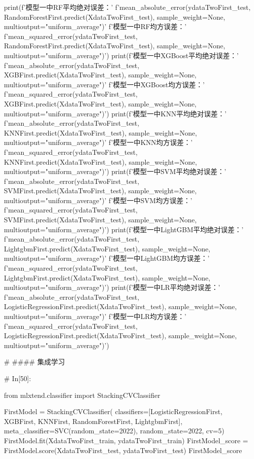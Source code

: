 \documentclass{MathorCupmodeling}
\begin{document}
\begin{python}
	
	print(f'模型一中RF平均绝对误差：'
		  f'{mean_absolute_error(ydataTwoFirst_test, RandomForestFirst.predict(XdataTwoFirst_test), sample_weight=None, multioutput="uniform_average")}\n'
		  f'模型一中RF均方误差：'
		  f'{mean_squared_error(ydataTwoFirst_test, RandomForestFirst.predict(XdataTwoFirst_test), sample_weight=None, multioutput="uniform_average")}')
	print(f'模型一中XGBoost平均绝对误差：'
		  f'{mean_absolute_error(ydataTwoFirst_test, XGBFirst.predict(XdataTwoFirst_test), sample_weight=None, multioutput="uniform_average")}\n'
		  f'模型一中XGBoost均方误差：'
		  f'{mean_squared_error(ydataTwoFirst_test, XGBFirst.predict(XdataTwoFirst_test), sample_weight=None, multioutput="uniform_average")}')
	print(f'模型一中KNN平均绝对误差：'
		  f'{mean_absolute_error(ydataTwoFirst_test, KNNFirst.predict(XdataTwoFirst_test), sample_weight=None, multioutput="uniform_average")}\n'
		  f'模型一中KNN均方误差：'
		  f'{mean_squared_error(ydataTwoFirst_test, KNNFirst.predict(XdataTwoFirst_test), sample_weight=None, multioutput="uniform_average")}')
	print(f'模型一中SVM平均绝对误差：'
		  f'{mean_absolute_error(ydataTwoFirst_test, SVMFirst.predict(XdataTwoFirst_test), sample_weight=None, multioutput="uniform_average")}\n'
		  f'模型一中SVM均方误差：'
		  f'{mean_squared_error(ydataTwoFirst_test, SVMFirst.predict(XdataTwoFirst_test), sample_weight=None, multioutput="uniform_average")}')
	print(f'模型一中LightGBM平均绝对误差：'
		  f'{mean_absolute_error(ydataTwoFirst_test, LightgbmFirst.predict(XdataTwoFirst_test), sample_weight=None, multioutput="uniform_average")}\n'
		  f'模型一中LightGBM均方误差：'
		  f'{mean_squared_error(ydataTwoFirst_test, LightgbmFirst.predict(XdataTwoFirst_test), sample_weight=None, multioutput="uniform_average")}')
	print(f'模型一中LR平均绝对误差：'
		  f'{mean_absolute_error(ydataTwoFirst_test, LogisticRegressionFirst.predict(XdataTwoFirst_test), sample_weight=None, multioutput="uniform_average")}\n'
		  f'模型一中LR均方误差：'
		  f'{mean_squared_error(ydataTwoFirst_test, LogisticRegressionFirst.predict(XdataTwoFirst_test), sample_weight=None, multioutput="uniform_average")}')
	
	# #### 集成学习
	
	# In[50]:
	
	
	from mlxtend.classifier import StackingCVClassifier
	
	FirstModel = StackingCVClassifier(
		classifiers=[LogisticRegressionFirst, XGBFirst, KNNFirst, RandomForestFirst, LightgbmFirst],
		meta_classifier=SVC(random_state=2022), random_state=2022, cv=5)
	FirstModel.fit(XdataTwoFirst_train, ydataTwoFirst_train)
	FirstModel_score = FirstModel.score(XdataTwoFirst_test, ydataTwoFirst_test)
	FirstModel_score
	

\end{python}
\end{document}

